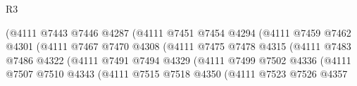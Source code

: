 \begin{lexlean}{R3}
\begin{coremodule}
                                          (@4111
                                            @7443
                                            @7446
                                            @4287
                                            (@4111
                                              @7451
                                              @7454
                                              @4294
                                              (@4111
                                                @7459
                                                @7462
                                                @4301
                                                (@4111
                                                  @7467
                                                  @7470
                                                  @4308
                                                  (@4111
                                                    @7475
                                                    @7478
                                                    @4315
                                                    (@4111
                                                      @7483
                                                      @7486
                                                      @4322
                                                      (@4111
                                                        @7491
                                                        @7494
                                                        @4329
                                                        (@4111
                                                          @7499
                                                          @7502
                                                          @4336
                                                          (@4111
                                                            @7507
                                                            @7510
                                                            @4343
                                                            (@4111
                                                              @7515
                                                              @7518
                                                              @4350
                                                              (@4111
                                                                @7523
                                                                @7526
                                                                @4357

\end{coremodule}
\end{lexlean}
